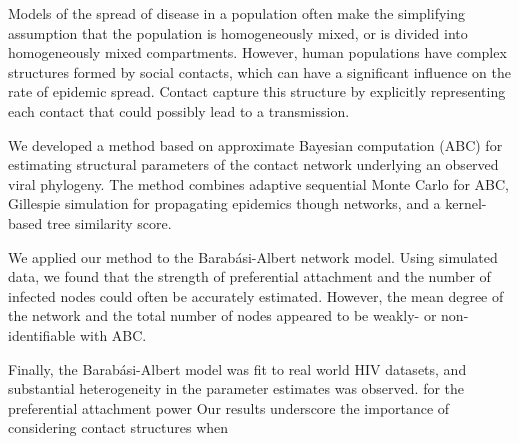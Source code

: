 
Models of the spread of disease in a population often make the simplifying
assumption that the population is homogeneously mixed, or is divided into
homogeneously mixed compartments. However, human populations have complex
structures formed by social contacts, which can have a significant influence on
the rate  of epidemic spread. Contact 
 capture this structure by explicitly representing each contact
that could possibly lead to a transmission. 

We developed a method based on approximate Bayesian computation (ABC) for
estimating structural parameters of the contact network underlying an
observed viral phylogeny. The method combines adaptive sequential Monte Carlo
for ABC, Gillespie simulation for propagating epidemics though networks, and a
 kernel-based tree similarity score. 

We applied our method to  the Barab\'{a}si-Albert network model.
  Using
simulated data, we found that the strength of preferential attachment and the
number of infected nodes could often be accurately estimated. However, the mean
degree of the network and the total number of nodes appeared to be weakly- or
non-identifiable with ABC. 



Finally, the Barab\'{a}si-Albert model was fit to  real
world HIV datasets, and substantial heterogeneity in the parameter estimates
was observed.   for the preferential
attachment power 
Our results underscore the importance of considering contact structures when
